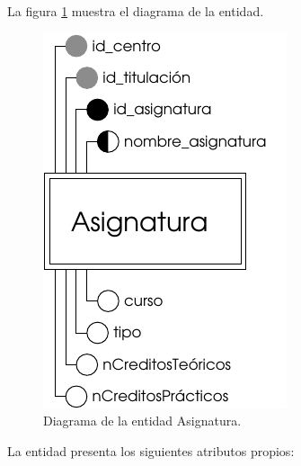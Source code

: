 \begin{description}
   \item[Diagrama] La figura \ref{diagramaAsignatura} muestra el diagrama de la entidad.
   \item \begin{figure}[!ht]
            \begin{center}
            \includegraphics[]{07.Modelo_Entidad-Interrelacion/7.2.Analisis_Entidades/diagramas/asignatura.pdf}
            \caption{Diagrama de la entidad Asignatura.}
            \label{diagramaAsignatura}
            \end{center}
         \end{figure}

   \item[Descripción de los atributos propios] La entidad presenta los
   siguientes atributos propios:


\end{description}
